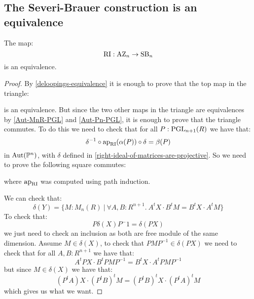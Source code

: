 \subsection{The Severi-Brauer construction is an equivalence}

\begin{proposition}\label{right-ideal-is-equivalence}
The map:
\[\mathrm{RI}:\mathrm{AZ}_n\to\mathrm{SB}_n\]
is an equivalence.
\end{proposition}

\begin{proof}
By \cref{deloopings-equivalence} it is enough to prove that the top map in the triangle:
\begin{center}
\end{center}
is an equivalence. But since the two other maps in the triangle are equivalences by \cref{Aut-MnR-PGL} and \cref{Aut-Pn-PGL}, it is enough to prove that the triangle commutes. To do this we need to check that for all $P:\operatorname{PGL}_{n+1}(R)$ we have that:
\[\delta^{-1}\circ \mathrm{ap}_{\mathrm{RI}}(\alpha(P))\circ\delta = \beta(P)\]
in $\mathrm{Aut}(\mathbb{P}^n)$, with $\delta$ defined in \cref{right-ideal-of-matrices-are-projective}. So we need to prove the following square commutes:
\begin{center}
\end{center}
where $\mathrm{ap}_{\mathrm{RI}}$ was computed using path induction.

We can check that:
\[\delta(Y) = \{M:M_n(R)\ |\ \forall A,B:R^{n+1}.\ A^tX\cdot B^tM = B^tX\cdot A^tM\}\]
To check that:
\[P\delta(X)P^-{1} = \delta(PX)\]
we just need to check an inclusion as both are free module of the same dimension. Assume $M\in\delta(X)$, to check that $PMP^{-1}\in\delta(PX)$ we need to check that for all $A,B:R^{n+1}$ we have that:
\[A^tPX\cdot B^tPMP^{-1} = B^tX\cdot A^tPMP^{-1}\]
but since $M\in\delta(X)$ we have that:
\[(P^tA)X\cdot (P^tB)^tM = (P^tB)^tX\cdot (P^tA)^tM\]
which gives us what we want.
\end{proof}
